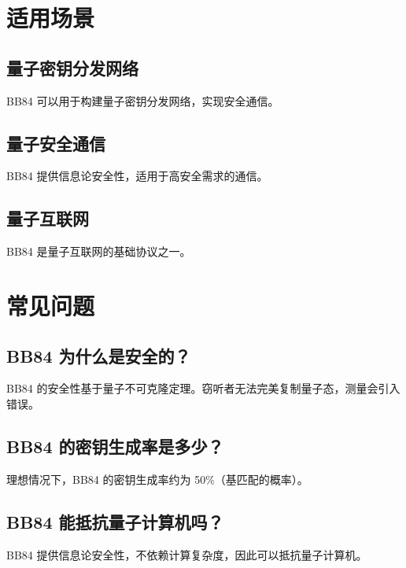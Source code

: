 \documentclass[12pt,a4paper]{article}
\begin{document}
\section{适用场景}

\subsection{量子密钥分发网络}

BB84 可以用于构建量子密钥分发网络，实现安全通信。

\subsection{量子安全通信}

BB84 提供信息论安全性，适用于高安全需求的通信。

\subsection{量子互联网}

BB84 是量子互联网的基础协议之一。

\section{常见问题}

\subsection{BB84 为什么是安全的？}

BB84 的安全性基于量子不可克隆定理。窃听者无法完美复制量子态，测量会引入错误。

\subsection{BB84 的密钥生成率是多少？}

理想情况下，BB84 的密钥生成率约为 50\%（基匹配的概率）。

\subsection{BB84 能抵抗量子计算机吗？}

BB84 提供信息论安全性，不依赖计算复杂度，因此可以抵抗量子计算机。

\end{document}
